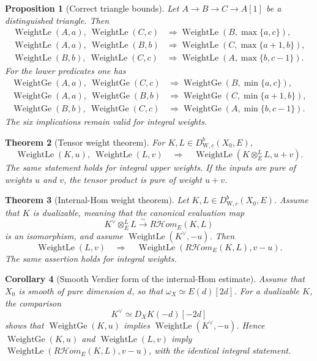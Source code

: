\documentclass[10pt]{article}
\newtheorem{theorem}{Theorem}[section]
\newtheorem{proposition}[theorem]{Proposition}
\newtheorem{corollary}[theorem]{Corollary}
\theoremstyle{definition}
\newcommand{\WeilD}{D^b_{\mathrm W,c}}
\newcommand{\WtLe}{\operatorname{WeightLe}}
\newcommand{\WtGe}{\operatorname{WeightGe}}
\newcommand{\RHom}{R\mathcal Hom}
\begin{document}
\begin{proposition}[Correct triangle bounds]
Let \(A\to B\to C\to A[1]\) be a distinguished triangle.  Then
\begin{align*}
 \WtLe(A,a),\ \WtLe(C,c)&\Longrightarrow
     \WtLe(B,\max\{a,c\}),\\
 \WtLe(A,a),\ \WtLe(B,b)&\Longrightarrow
     \WtLe(C,\max\{a+1,b\}),\\
 \WtLe(B,b),\ \WtLe(C,c)&\Longrightarrow
     \WtLe(A,\max\{b,c-1\}).
\end{align*}
For the lower predicates one has
\begin{align*}
 \WtGe(A,a),\ \WtGe(C,c)&\Longrightarrow
     \WtGe(B,\min\{a,c\}),\\
 \WtGe(A,a),\ \WtGe(B,b)&\Longrightarrow
     \WtGe(C,\min\{a+1,b\}),\\
 \WtGe(B,b),\ \WtGe(C,c)&\Longrightarrow
     \WtGe(A,\min\{b,c-1\}).
\end{align*}
The six implications remain valid for integral weights.
\end{proposition}

\begin{theorem}[Tensor weight theorem]
For \(K,L\in\WeilD(X_0,E)\),
\[
 \WtLe(K,u),\ \WtLe(L,v)
 \quad\Longrightarrow\quad
 \WtLe(K\otimes_E^LL,u+v).
\]
The same statement holds for integral upper weights.  If the inputs are
pure of weights \(u\) and \(v\), the tensor product is pure of weight
\(u+v\).
\end{theorem}

\begin{theorem}[Internal-Hom weight theorem]
Let \(K,L\in\WeilD(X_0,E)\).  Assume that \(K\) is dualizable, meaning
that the canonical evaluation map
\[
             K^\vee\otimes_E^LL\xrightarrow{\sim}\RHom_E(K,L)
\]
is an isomorphism, and assume \(\WtLe(K^\vee,-u)\).  Then
\[
 \WtLe(L,v)
 \quad\Longrightarrow\quad
 \WtLe(\RHom_E(K,L),v-u).
\]
The same assertion holds for integral weights.
\end{theorem}

\begin{corollary}[Smooth Verdier form of the internal-Hom estimate]
Assume that \(X_0\) is smooth of pure dimension \(d\), so that
\(\omega_X\simeq E(d)[2d]\).  For a dualizable \(K\), the comparison
\[
 K^\vee\simeq D_XK(-d)[-2d]
\]
shows that \(\WtGe(K,u)\) implies \(\WtLe(K^\vee,-u)\).  Hence
\(\WtGe(K,u)\) and \(\WtLe(L,v)\) imply
\(\WtLe(\RHom_E(K,L),v-u)\), with the identical integral statement.
\end{corollary}
\end{document}
